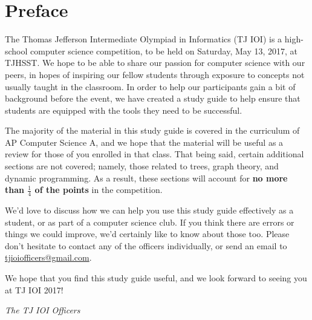 \chapter{Preface}

The Thomas Jefferson Intermediate Olympiad in Informatics (TJ IOI) is a high-school computer science competition, to be held on Saturday, May 13, 2017, at TJHSST.  We hope to be able to share our passion for computer science with our peers, in hopes of inspiring our fellow students through exposure to concepts not usually taught in the classroom.  In order to help our participants gain a bit of background before the event, we have created a study guide to help ensure that students are equipped with the tools they need to be successful.

The majority of the material in this study guide is covered in the curriculum of AP Computer Science A, and we hope that the material will be useful as a review for those of you enrolled in that class. That being said, certain additional sections are not covered; namely, those related to trees, graph theory, and dynamic programming. As a result, these sections will account for \textbf{no more than $\frac{1}{4}$ of the points} in the competition.

We'd love to discuss how we can help you use this study guide effectively as a student, or as part of a computer science club. If you think there are errors or things we could improve, we'd certainly like to know about those too. Please don't hesitate to contact any of the officers individually, or send an email to \href{mailto:tjioiofficers@gmail.com}{tjioiofficers@gmail.com}.

We hope that you find this study guide useful, and we look forward to seeing you at TJ IOI 2017!

\noindent\textit{The TJ IOI Officers} \\
